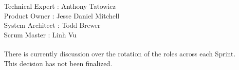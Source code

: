 Technical Expert : Anthony Tatowicz
\\Product Owner : Jesse Daniel Mitchell
\\System Architect : Todd Brewer
\\Scrum Master : Linh Vu
\\
\\
There is currently discussion over the rotation of the roles across each Sprint. This decision has not been finalized.